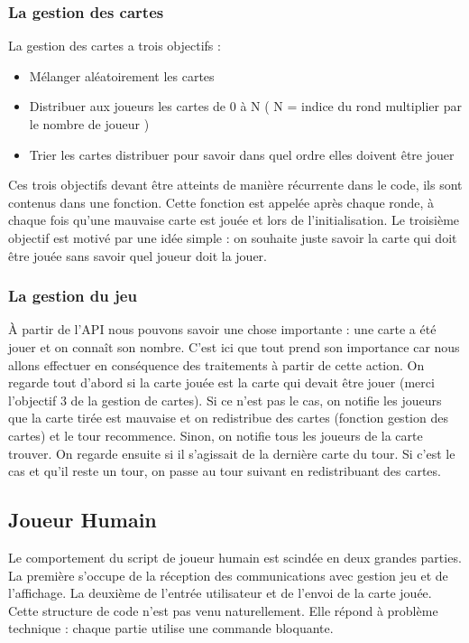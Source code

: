 \documentclass{article}
\begin{document}
\subsubsection{La gestion des cartes}

La gestion des cartes a trois objectifs :

\begin{itemize}
	\item Mélanger aléatoirement les cartes
	\item Distribuer aux joueurs les cartes de 0 à N ( N = indice du rond multiplier par le nombre de joueur )
	\item Trier les cartes distribuer pour savoir dans quel ordre elles doivent être jouer
\end{itemize}

Ces trois objectifs devant être atteints de manière récurrente dans le code, ils sont contenus dans une fonction. Cette fonction est appelée après chaque ronde, à chaque fois qu'une mauvaise carte est jouée et lors de l'initialisation. 
\newline
\newline
Le troisième objectif est motivé par une idée simple : on souhaite juste savoir la carte qui doit être jouée sans savoir quel joueur doit la jouer. 

\subsubsection{La gestion du jeu}

À partir de l'API nous pouvons savoir une chose importante : 
une carte a été jouer et on connaît son nombre. C'est ici que tout prend son importance car nous allons effectuer en conséquence des traitements à partir de cette action.\newline
On regarde tout d'abord si la carte jouée est la carte qui devait être jouer (merci l'objectif 3 de la gestion de cartes). Si ce n'est pas le cas, on notifie les joueurs que la carte tirée est mauvaise et on redistribue des cartes (fonction gestion des cartes) et le tour recommence. Sinon, on notifie tous les joueurs de la carte trouver. On regarde ensuite si il s'agissait de la dernière carte du tour. Si c'est le cas et qu'il reste un tour, on passe au tour suivant en redistribuant des cartes. 

\subsection{Joueur Humain}
Le comportement du script de joueur humain est scindée en deux grandes parties. La première s'occupe de la réception des communications avec gestion jeu et de l'affichage. La deuxième de l'entrée utilisateur et de l'envoi de la carte jouée. Cette structure de code n'est pas venu naturellement. Elle répond à problème technique : chaque partie utilise une commande bloquante. 
\end{document}
